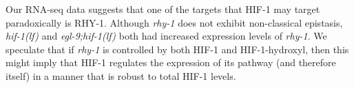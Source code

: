 \documentclass[9pt,twocolumn,twoside]{pnas-new}
\newcommand{\gene}[1]{\emph{#1}}
\newcommand{\eglhif}{\emph{egl-9;hif-1(lf)}}
\newcommand{\hif}{\emph{hif-1(lf)}}
\newcommand{\rhyp}{RHY-1}
\newcommand{\hifp}{HIF-1}
\begin{document}
Our RNA-seq data suggests that one of the targets that \hifp{} may target
paradoxically is \rhyp{}. Although \gene{rhy-1} does not exhibit non-classical
epistasis, \hif{} and \eglhif{} both had increased expression levels of \gene{rhy-1}.
We speculate that if \gene{rhy-1} is controlled by both \hifp{} and \hifp{}-hydroxyl,
then this might imply that \hifp{} regulates the expression of its pathway (and
therefore itself) in a manner that is robust to total \hifp{} levels.

\end{document}
